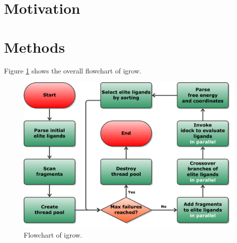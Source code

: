 \documentclass[10pt, conference, compsocconf]{IEEEtran}
\begin{document}
\section{Motivation}



\section{Methods}

Figure \ref{fig:Flowchart} shows the overall flowchart of igrow. 

\begin{figure}
\centering
\includegraphics[width=\linewidth]{../igrow/Flowchart.pdf}
\caption{Flowchart of igrow.}
\label{fig:Flowchart}
\end{figure}
\end{document}
